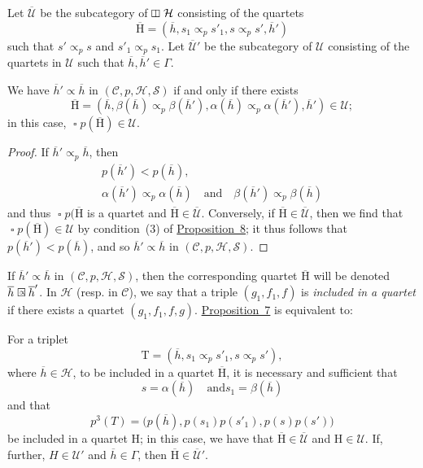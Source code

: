 \documentclass[a4paper,fleqn]{article}
\theoremstyle{plain}
\newenvironment{proposition}[1]
  {\renewcommand\theinnerproposition{#1}\innerproposition}
  {\endinnerproposition}
\theoremstyle{definition}
\newcommand{\oldpage}[1]{{\marginpar{\footnotesize$\bigg\vert$\,\,\,\,\textit{p.~#1}}}}
\newcommand{\textand}{\quad\text{and}\quad}
\newcommand{\CC}{\mathcal{C}}
\newcommand{\HH}{\mathcal{H}}
\newcommand{\rHH}{\mathrm{H}}
\renewcommand{\SS}{\mathcal{S}}
\newcommand{\UU}{\mathcal{U}}
\newcommand{\subs}{\mathrel{\propto}}
\newcommand{\vsqbox}{{\rotatebox{90}{$\boxminus$}}}
\DeclareMathOperator{\sq}{\square}
\DeclareMathOperator{\vsq}{\raisebox{-.1em}{$\vsqbox$\,}}
\newcommand{\sqsubs}{\mathrel{\mathrlap{\square}\raisebox{.17em}{\scaleobj{0.65}{\,\,\propto}}}}
\begin{document}
\oldpage{366}
Let $\overline{\UU}$ be the subcategory of $\vsq\HH$ consisting of the quartets
\[
  \overline{\rHH}
  = (\overline{h}, s_1\subs_p s'_1, s\subs_p s', \overline{h}')
\]
such that $s'\subs_p s$ and $s'_1\subs_p s_1$.
Let $\overline{\UU}'$ be the subcategory of $\UU$ consisting of the quartets in $\UU$ such that $\overline{h},\overline{h}'\in\Gamma$.

\begin{proposition}{9}
\label{proposition:i-9}
  We have $\overline{h}'\subs\overline{h}$ in $(\CC,p,\HH,\SS)$ if and only if there exists
  \[
    \overline{\rHH}
    = \left(
      \overline{h},
      \beta(\overline{h})\subs_p\beta(\overline{h}'),
      \alpha(\overline{h})\subs_p\alpha(\overline{h}'),
      \overline{h}'
    \right) \in \UU;
  \]
  in this case, $\sq p(\overline{\rHH})\in\UU$.
\end{proposition}

\begin{proof}
  If $\overline{h}'\subs_p\overline{h}$, then
  \[
    \begin{gathered}
      p(\overline{h}')<p(\overline{h}),
    \\\alpha(\overline{h}')\subs_p\alpha(\overline{h})
      \textand
      \beta(\overline{h}')\subs_p\beta(\overline{h})
    \end{gathered}
  \]
  and thus $\sq p(\overline{\rHH}$ is a quartet and $\overline{\rHH}\in\overline{\UU}$.
  Conversely, if $\overline{\rHH}\in\overline{\UU}$, then we find that $\sq p(\overline{\rHH})\in\UU$ by condition~(3) of \hyperref[proposition:i-8]{Proposition~8};
  it thus follows that $p(\overline{h}')<p(\overline{h})$, and so $\overline{h}'\subs\overline{h}$ in $(\CC,p,\HH,\SS)$.
\end{proof}

If $\overline{h}'\subs\overline{h}$ in $(\CC,p,\HH,\SS)$, then the corresponding quartet $\overline{\rHH}$ will be denoted $\overline{h}\sqsubs\overline{h}'$.
In $\HH$ (resp. in $\CC$), we say that a triple $(g_1,f_1,f)$  is \emph{included in a quartet} if there exists a quartet $(g_1,f_1,f,g)$.
\hyperref[proposition:i-7]{Proposition~7} is equivalent to:

\begin{proposition}{7~\emph{bis}}
\label{proposition:i-7bis}
  For a triplet
  \[
    \mathrm{T}
    = (\overline{h},s_1\subs_p s'_1, s\subs_p s'),
  \]
  where $\overline{h}\in\HH$, to be included in a quartet $\overline{\rHH}$, it is necessary and sufficient that
  \[
    s=\alpha(\overline{h})
    \quad\text{and}
    s_1=\beta(\overline{h})
  \]
  and that
  \[
    p^3(T)
    = \big(
      p(\overline{h}), p(s_1)p(s'_1), p(s)p(s')
    \big)
  \]
  be included in a quartet $\rHH$;
  in this case, we have that $\overline{\rHH}\in\overline{\UU}$ and $\rHH\in\UU$.
  If, further, $H\in\UU'$ and $\overline{h}\in\Gamma$, then $\overline{\rHH}\in\overline{\UU}'$.
\end{proposition}
\end{document}
